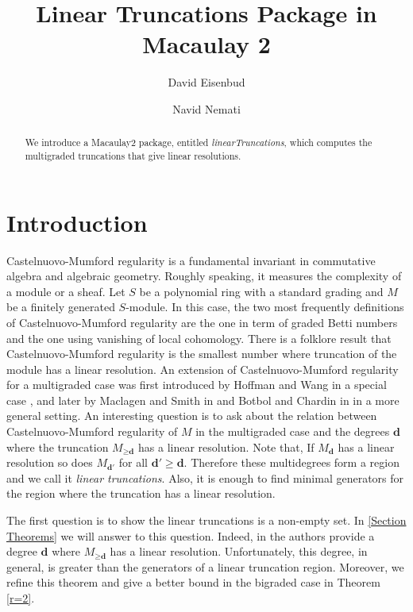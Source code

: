 \documentclass[11pt]{amsart}
\theoremstyle{definition}
\begin{document}
\title[LinearTruncations.m2]{Linear Truncations Package in Macaulay 2} 
\author{David Eisenbud}
\address{Mathematical Sciences Research Institute, Berkeley, CA 94720, USA}
\author{Navid Nemati}
\address{Institut de Math\'{e}matiques de Jussieu, Sorbonne Universit\'{e}, 4 Place de Jussieu, 75005 Paris, France}


\begin{abstract}
 We introduce a  Macaulay2 package, entitled \textit{linearTruncations}, which computes the multigraded truncations that give linear resolutions.
\end{abstract}

\maketitle
\section{Introduction}

Castelnuovo-Mumford regularity is a fundamental invariant in commutative algebra and algebraic geometry. Roughly speaking, it measures the complexity of a module or a sheaf. Let $S$ be a polynomial ring with a standard grading and $M$ be a finitely generated $S$-module. In this case, the two most frequently definitions of Castelnuovo-Mumford regularity are the one in term of graded Betti numbers and the one using vanishing of local cohomology. There is a folklore result that Castelnuovo-Mumford regularity is the smallest number where truncation of the module has a linear resolution. An extension of Castelnuovo-Mumford regularity for a multigraded case was first introduced by Hoffman and Wang in a special case \cite{HoffmanWang}, and later by Maclagen and Smith in \cite{MaclagenSmith} and Botbol and Chardin in \cite{BotbolChardin} in a more general setting. An interesting question is to ask about the relation between Castelnuovo-Mumford regularity of $M$ in the multigraded case and the degrees $\textbf{d}$ where the truncation $M_{\geq \textbf{d}}$ has a linear resolution.  Note that, If $M_{\textbf{d}}$ has a linear resolution so does $M_{\textbf{d}'}$  for all $\textbf{d}'\geq \textbf{d}$. Therefore these multidegrees form a region and we call it \textit{linear truncations}. Also, it is enough to find  minimal generators for the region where the truncation has a linear resolution.



The first question is to show the linear truncations is a non-empty set.  In  \autoref{Section Theorems} we will answer to this question. Indeed, in  \cite{EisenbudErmanSchreyer}  the authors provide a degree $\textbf{d}$  where $M_{\geq \textbf{d}}$ has a linear resolution. Unfortunately, this degree, in general,  is greater than the generators of a linear truncation region. Moreover, we refine this theorem and give a better bound in the bigraded case in Theorem \autoref{r=2}.
\end{document}
